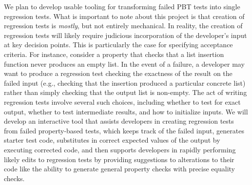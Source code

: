 We plan to develop usable tooling for transforming failed
PBT tests into single regression tests. What is important to
note about this project is that creation of regression tests
is \emph{mostly}, but not entirely mechanical. In reality,
the creation of regression tests will likely require
judicious incorporation of the developer's input at key
decision points. This is particularly the case for
specifying acceptance criteria. For instance, consider a
property that checks that a list insertion function never
produces an empty list. In the event of a failure, a developer may want to produce
a regression test checking the exactness of the result on
the failed input (e.g., checking that the insertion produced
a particular concrete list) rather than simply checking that
the output list is non-empty. The act of writing regression
tests involve several such choices, including whether to
test for exact output, whether to test intermediate results,
and how to initialize inputs. We will develop an interactive
tool that assists developers in creating regression tests
from failed property-based tests, which keeps track of the
failed input, generates starter test code, substitutes in correct
expected values of the output by executing corrected code,
and then supports developers in rapidly performing likely
edits to regression tests by providing suggestions to
alterations to their code like the ability to generate
general property checks with precise equality checks.



